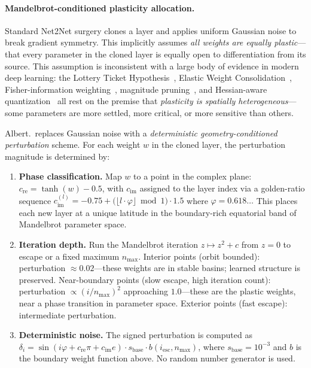\documentclass[11pt,a4paper]{article}
\begin{document}
\paragraph{Mandelbrot-conditioned plasticity allocation.}
\label{para:mandelbrot}
Standard Net2Net surgery clones a layer and applies uniform Gaussian noise to
break gradient symmetry. This implicitly assumes \emph{all weights are equally
plastic}---that every parameter in the cloned layer is equally open to
differentiation from its source. This assumption is inconsistent with a large
body of evidence in modern deep learning: the Lottery Ticket
Hypothesis~\cite{frankle2019lottery}, Elastic Weight
Consolidation~\cite{kirkpatrick2017overcoming}, Fisher-information
weighting~\cite{martens2015optimizing}, magnitude
pruning~\cite{han2015learning}, and Hessian-aware
quantization~\cite{dong2019hawq} all rest on the premise that \emph{plasticity
is spatially heterogeneous}---some parameters are more settled, more critical,
or more sensitive than others.

Albert.\ replaces Gaussian noise with a \emph{deterministic geometry-conditioned
perturbation} scheme. For each weight $w$ in the cloned layer, the perturbation
magnitude is determined by:

\begin{enumerate}
  \item \textbf{Phase classification.} Map $w$ to a point in the complex plane:
        $c_\text{re} = \tanh(w) - 0.5$, with $c_\text{im}$ assigned to the layer
        index via a golden-ratio sequence
        $c_\text{im}^{(l)} = -0.75 + \bigl(\lfloor l\cdot\varphi\rfloor
        \bmod 1\bigr)\cdot 1.5$ where $\varphi = 0.618\ldots$ This places each
        new layer at a unique latitude in the boundary-rich equatorial band of
        Mandelbrot parameter space.

  \item \textbf{Iteration depth.} Run the Mandelbrot iteration
        $z \mapsto z^2 + c$ from $z=0$ to escape or a fixed maximum $n_{\max}$.
        Interior points (orbit bounded): perturbation $\approx 0.02$---these
        weights are in stable basins; learned structure is preserved.
        Near-boundary points (slow escape, high iteration count): perturbation
        $\propto (i/n_{\max})^2$ approaching $1.0$---these are the plastic weights,
        near a phase transition in parameter space.
        Exterior points (fast escape): intermediate perturbation.

  \item \textbf{Deterministic noise.} The signed perturbation is computed as
        $\delta_i = \sin(i\varphi + c_\text{re}\pi + c_\text{im}e)
        \cdot s_\text{base} \cdot b(i_\text{esc}, n_{\max})$, where $s_\text{base}
        = 10^{-3}$ and $b$ is the boundary weight function above. No random
        number generator is used.
\end{enumerate}
\end{document}
